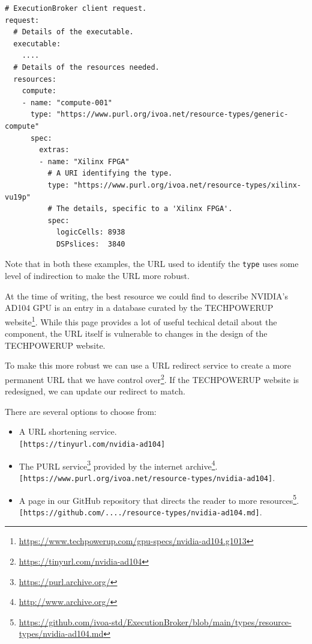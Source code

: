 \documentclass[11pt,a4paper]{ivoa}
\newcommand{\codeword}[1] {\texttt{#1}}
\newcommand{\footurl}[1] {\footnote{\url{#1}}}
\begin{document}
\begin{lstlisting}[]
# ExecutionBroker client request.
request:
  # Details of the executable.
  executable:
    ....
  # Details of the resources needed.
  resources:
    compute:
    - name: "compute-001"
      type: "https://www.purl.org/ivoa.net/resource-types/generic-compute"
      spec:
        extras:
        - name: "Xilinx FPGA"
          # A URI identifying the type.
          type: "https://www.purl.org/ivoa.net/resource-types/xilinx-vu19p"
          # The details, specific to a 'Xilinx FPGA'.
          spec:
            logicCells: 8938
            DSPslices:  3840
\end{lstlisting}

Note that in both these examples, the URL used to identify the \codeword{type}
uses some level of indirection to make the URL more robust.

At the time of writing, the best resource we could find to describe NVIDIA's AD104 GPU
is an entry in a database curated by the TECHPOWERUP
website\footurl{https://www.techpowerup.com/gpu-specs/nvidia-ad104.g1013}.
While this page provides a lot of useful techical detail about the component,
the URL itself is vulnerable to changes in the design of the TECHPOWERUP website.

To make this more robust we can use a URL redirect service to create a more permanent
URL that we have control over\footurl{https://tinyurl.com/nvidia-ad104}.
If the TECHPOWERUP website is redesigned, we can update
our redirect to match.

There are several options to choose from:
\begin{itemize}
\item A URL shortening service.\\
      \codeword{[https://tinyurl.com/nvidia-ad104]}
\item The PURL service\footurl{https://purl.archive.org/} provided by the internet archive\footurl{http://www.archive.org/}.\\
      \codeword{[https://www.purl.org/ivoa.net/resource-types/nvidia-ad104]}.
\item A page in our GitHub repository that directs the reader to more resources\footurl{https://github.com/ivoa-std/ExecutionBroker/blob/main/types/resource-types/nvidia-ad104.md}.\\
      \codeword{[https://github.com/..../resource-types/nvidia-ad104.md]}.
\end{itemize}
\end{document}
